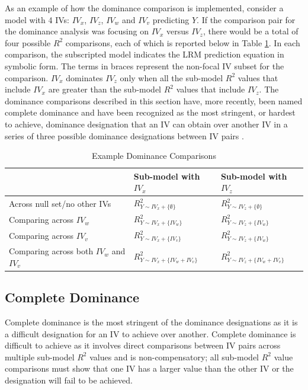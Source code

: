 \documentclass[man]{apa7}
\begin{document}
	As an example of how the dominance comparison is implemented, consider a model with 4 IVs: $IV_x$, $IV_z$, $IV_w$ and $IV_v$ predicting $Y$.
	If the comparison pair for the dominance analysis was focusing on $IV_x$ versus $IV_z$, there would be a total of four possible $R^2$ comparisons, each of which is reported below in Table \ref{tab:exdom}.
	In each comparison, the subscripted model indicates the LRM prediction equation in symbolic form.
	The terms in braces represent the non-focal IV subset for the comparison.
	$IV_x$ dominates $IV_z$ only when all the sub-model $R^2$ values that include $IV_x$ are greater than the sub-model $R^2$ values that include $IV_z$.
	The dominance comparisons described in this section have, more recently, been named complete dominance and have been recognized as the most stringent, or hardest to achieve, dominance designation that an IV can obtain over another IV in a series of three possible dominance designations between IV pairs \parencite{azen2003dominance}.	

		\begin{table}[h!]
			\centering
			\caption{\centering Example Dominance Comparisons}
			\begin{tabular}{ l | l l }
				
				& Sub-model with $IV_x$ & Sub-model with $IV_z$ \\
				\hline
				Across null set/no other IVs & $R^2_{Y \sim IV_x + \{\emptyset\}}$ & $R^2_{Y \sim IV_z+ \{\emptyset\} }$ \\
				Comparing across $IV_w$ & $R^2_{Y \sim IV_x + \{IV_w\}}$ & $R^2_{Y \sim IV_z + \{IV_w\}}$ \\
				Comparing across $IV_v$ & $R^2_{Y \sim IV_x + \{IV_v\}}$ & $R^2_{Y \sim IV_z + \{IV_w\}}$ \\
				Comparing across both $IV_w$ and $IV_v$ & $R^2_{Y \sim IV_x + \{IV_w + IV_v\}}$ & $R^2_{Y \sim IV_z + \{IV_w + IV_v\}}$ \\
				\hline
		\end{tabular}
		\label{tab:exdom}
	\end{table}
	
	\subsection{Complete Dominance}
	
	Complete dominance is the most stringent of the dominance designations as it is a difficult designation for an IV to achieve over another.
	Complete dominance is difficult to achieve as it involves direct comparisons between IV pairs across multiple sub-model $R^2$ values and is non-compensatory; all sub-model $R^2$ value comparisons must show that one IV has a larger value than the other IV or the designation will fail to be achieved.
	
\end{document}
